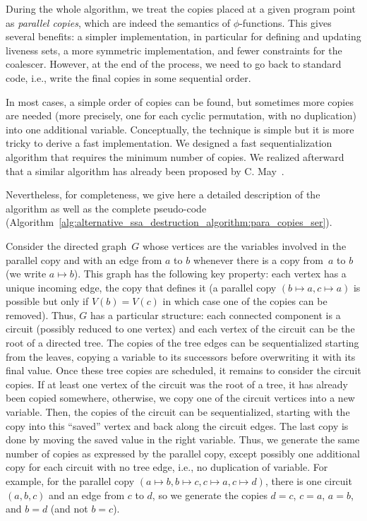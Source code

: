                     
During the whole algorithm, we treat the copies placed at a given program point
as \emph{parallel copies}, which are indeed the semantics of $\phi$-functions.
This gives several benefits: a simpler implementation, in particular for
defining and updating liveness sets, a more symmetric implementation,
and fewer constraints for the coalescer. However, at the end of the process, we
need to go back to standard code, i.e., write the final copies in some
sequential order.

\ifhab
In most cases, a simple order of copies can be found, but sometimes more copies
are needed (more precisely, one for each cyclic permutation, with no
duplication) into one additional variable. Conceptually, the technique is
simple but it is more tricky to derive a fast implementation.  We designed a
fast sequentialization algorithm that requires the minimum number of copies.
We realized afterward that a similar algorithm has already been proposed by C.
May~\cite{May89}.

Nevertheless, for completeness, we give here a detailed description of
the algorithm as well as the complete pseudo-code
(Algorithm~\ref{alg:alternative_ssa_destruction_algorithm:para_copies_ser}).

Consider the directed graph~$G$ whose vertices are the variables
involved in the parallel copy and with an edge from $a$ to $b$
whenever there is a copy from~$a$ to $b$ (we write $a \mapsto
b$). This graph has the following key property: each vertex has a
unique incoming edge, the copy that defines it (a parallel copy $(b
\mapsto a, c \mapsto a)$ is possible but only if $V(b)=V(c)$ in which
case one of the copies can be removed). Thus, $G$ has a particular
structure: each connected component is a circuit (possibly reduced to
one vertex) and each vertex of the circuit can be the root of a
directed tree. The copies of the tree edges can be sequentialized
starting from the leaves, copying a variable to its successors before
overwriting it with its final value. Once these tree copies are
scheduled, it remains to consider the circuit copies. If at least one
vertex of the circuit was the root of a tree, it has already been
copied somewhere, otherwise, we copy one of the circuit vertices into
a new variable.  Then, the copies of the circuit can be
sequentialized, starting with the copy into this ``saved'' vertex and
back along the circuit edges. The last copy is done by moving the
saved value in the right variable. Thus, we generate the same number
of copies as expressed by the parallel copy, except possibly one
additional copy for each circuit with no tree edge, i.e., no
duplication of variable.  For example, for the parallel copy $(a
\mapsto b, b \mapsto c, c \mapsto a, c \mapsto d)$, there is one
circuit $(a,b,c)$ and an edge from $c$ to $d$, so we generate the
copies $d=c$, $c=a$, $a=b$, and $b=d$ (and not $b=c$).

